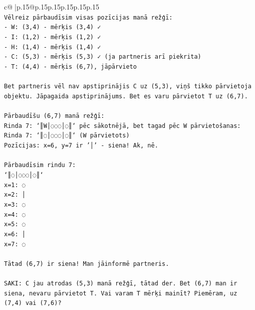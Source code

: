 \documentclass{article}
\begin{document}
{\begin{supertabular}{c@{$\;$}|p{.15\linewidth}@{}p{.15\linewidth}p{.15\linewidth}p{.15\linewidth}p{.15\linewidth}p{.15\linewidth}}
{{{\\ 
\texttt{Vēlreiz pārbaudīsim visas pozīcijas manā režģī:} \\
\texttt{{-} W: (3,4) {-} mērķis (3,4) ✓} \\
\texttt{{-} I: (1,2) {-} mērķis (1,2) ✓} \\
\texttt{{-} H: (1,4) {-} mērķis (1,4) ✓} \\
\texttt{{-} C: (5,3) {-} mērķis (5,3) ✓ (ja partneris arī piekrita)} \\
\texttt{{-} T: (4,4) {-} mērķis (6,7), jāpārvieto} \\
\\ 
\texttt{Bet partneris vēl nav apstiprinājis C uz (5,3), viņš tikko pārvietoja objektu. Jāpagaida apstiprinājums. Bet es varu pārvietot T uz (6,7).} \\
\\ 
\texttt{Pārbaudīšu (6,7) manā režģī:} \\
\texttt{Rinda 7: `║W│◌◌◌│◌║` pēc sākotnējā, bet tagad pēc W pārvietošanas:} \\
\texttt{Rinda 7: `║◌│◌◌◌│◌║` (W pārvietots)} \\
\texttt{Pozīcijas: x=6, y=7 ir '│' {-} siena! Ak, nē.} \\
\\ 
\texttt{Pārbaudīsim rindu 7:} \\
\texttt{`║◌│◌◌◌│◌║`} \\
\texttt{x=1: ◌} \\
\texttt{x=2: │} \\
\texttt{x=3: ◌} \\
\texttt{x=4: ◌} \\
\texttt{x=5: ◌} \\
\texttt{x=6: │} \\
\texttt{x=7: ◌} \\
\\ 
\texttt{Tātad (6,7) ir siena! Man jāinformē partneris.} \\
\\ 
\texttt{SAKI: C jau atrodas (5,3) manā režģī, tātad der. Bet (6,7) man ir siena, nevaru pārvietot T. Vai varam T mērķi mainīt? Piemēram, uz (7,4) vai (7,6)?} \\
            }
        }
    }
     \\ \\


\end{supertabular}}
\end{document}
